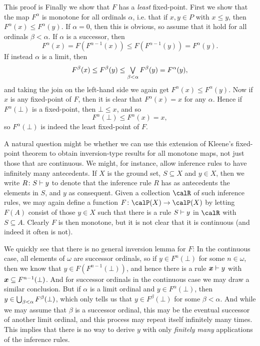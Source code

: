 \documentclass[a4paper, 11pt, article, danish, oneside]{memoir}
\DeclarePairedDelimiter{\auxdelimparen}{(}{)}
\newcommand{\powerset}[2][]{\calP\auxdelimparen[#1]{#2}}
\DeclareMathOperator*{\smallbigvee}{\textstyle\bigvee}
\DeclareMathOperator*{\bigjoin}{\mathchoice
    {\smallbigvee}%
    {\bigvee}%
    {\bigvee}%
    {\bigvee}%
}
\DeclareMathOperator*{\smallbigcup}{\textstyle\bigcup}
\DeclareMathOperator*{\bigunion}{\mathchoice
    {\smallbigcup}%
    {\bigcup}%
    {\bigcup}%
    {\bigcup}%
}
\begin{document}
\begin{prooffootnote}{This proof is }
    Finally we show that $F$ has a \emph{least} fixed-point. First we show that the map $F^\alpha$ is monotone for all ordinals $\alpha$, i.e. that if $x,y \in P$ with $x \leq y$, then $F^\alpha(x) \leq F^\alpha(y)$. If $\alpha = 0$, then this is obvious, so assume that it hold for all ordinals $\beta < \alpha$. If $\alpha$ is a successor, then
    \begin{equation*}
        F^\alpha(x)
            = F(F^{\alpha-1}(x))
            \leq F(F^{\alpha-1}(y))
            = F^\alpha(y).
    \end{equation*}
    If instead $\alpha$ is a limit, then
    \begin{equation*}
        F^\beta(x)
            \leq F^\beta(y)
            \leq \bigjoin_{\beta < \alpha} F^\beta(y)
            = F^\alpha(y),
    \end{equation*}
    and taking the join on the left-hand side we again get $F^\alpha(x) \leq F^\alpha(y)$. Now if $x$ is any fixed-point of $F$, then it is clear that $F^\alpha(x) = x$ for any $\alpha$. Hence if $F^\alpha(\bot)$ is a fixed-point, then $\bot \leq x$, and so
    \begin{equation}
        F^\alpha(\bot)
            \leq F^\alpha(x)
            = x,
    \end{equation}
    so $F^\alpha(\bot)$ is indeed the least fixed-point of $F$.
\end{prooffootnote}

A natural question might be whether we can use this extension of Kleene's fixed-point theorem to obtain inversion-type results for all monotone maps, not just those that are continuous. We might, for instance, allow inference rules to have infinitely many antecedents. If $X$ is the ground set, $S \subseteq X$ and $y \in X$, then we write $\myinfrule{R}{S}{y}$ to denote that the inference rule $R$ has as antecedents the elements in $S$, and $y$ as consequent. Given a collection $\calR$ of such inference rules, we may again define a function $F \colon \powerset{X} \to \powerset{X}$ by letting $F(A)$ consist of those $y \in X$ such that there is a rule $\myinfrule{}{S}{y}$ in $\calR$ with $S \subseteq A$. Clearly $F$ is then monotone, but it is not clear that it is continuous (and indeed it often is not).

We quickly see that there is no general inversion lemma for $F$: In the continuous case, all elements of $\omega$ are successor ordinals, so if $y \in F^n(\bot)$ for some $n \in \omega$, then we know that $y \in F(F^{n-1}(\bot))$, and hence there is a rule $\myinfrule{}{\seq{x}}{y}$ with $\bm{x} \subseteq F^{n-1}(\bot)$. And for successor ordinals in the continuous case we may draw a similar conclusion. But if $\alpha$ is a limit ordinal and $y \in F^\alpha(\bot)$, then $y \in \bigunion_{\beta < \alpha} F^\beta(\bot)$, which only tells us that $y \in F^\beta(\bot)$ for some $\beta < \alpha$. And while we may assume that $\beta$ is a successor ordinal, this may be the eventual successor of another limit ordinal, and this process may repeat itself infinitely many times. This implies that there is no way to derive $y$ with only \emph{finitely many} applications of the inference rules.
\end{document}
